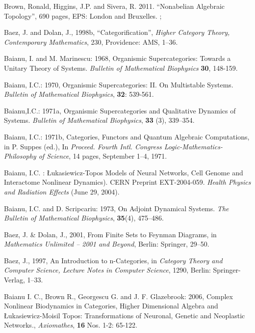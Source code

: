 \documentclass[12pt]{article}
\theoremstyle{plain}
\theoremstyle{definition}
\numberwithin{equation}{section}
\begin{document}
\begin{thebibliography}{99}

Brown, Ronald, Higgins, J.P. and Sivera, R. 2011. ``Nonabelian Algebraic Topology'', 690 pages,  EPS: London and Bruxelles. ;


Baez, J. and Dolan, J., 1998b, ``Categorification'', {\em Higher Category Theory, Contemporary Mathematics}, 230, Providence: AMS, 1--36.

Baianu, I. and M. Marinescu: 1968, Organismic Supercategories: Towards a Unitary Theory of Systems. \emph{Bulletin of Mathematical Biophysics} \textbf{30}, 148-159.

Baianu, I.C.: 1970, Organismic Supercategories: II. On Multistable Systems. \emph{Bulletin of Mathematical Biophysics}, \textbf{32}: 539-561.

Baianu,I.C.: 1971a, Organismic Supercategories and Qualitative Dynamics of Systems. \emph{Bulletin of Mathematical Biophysics}, \textbf{33} (3), 339--354.

Baianu, I.C.: 1971b, Categories, Functors and Quantum Algebraic Computations, in P. Suppes (ed.), In \emph{Proceed. Fourth Intl. Congress Logic-Mathematics-Philosophy of Science}, 14 pages, September 1--4, 1971. 

Baianu, I.C. : \L ukasiewicz-Topos Models of Neural Networks, Cell Genome and Interactome Nonlinear Dynamics). CERN Preprint EXT-2004-059. \textit{Health Physics and Radiation Effects} (June 29, 2004).

Baianu, I.C.  and D. Scripcariu: 1973, On Adjoint Dynamical Systems. \emph{The Bulletin of Mathematical Biophysics}, \textbf{35}(4), 475--486.

Baez, J. \& Dolan, J., 2001, From Finite Sets to Feynman Diagrams,
in \emph{Mathematics Unlimited -- 2001 and Beyond}, Berlin: Springer, 29--50.

Baez, J., 1997, An Introduction to n-Categories,
in \emph{Category Theory and Computer Science, Lecture Notes in Computer Science}, 1290, Berlin: Springer-Verlag, 1--33.

Baianu I. C., Brown R., Georgescu G. and J. F. Glazebrook: 2006, Complex Nonlinear Biodynamics in Categories, Higher Dimensional Algebra and \L{}ukasiewicz-Moisil Topos: Transformations of Neuronal, Genetic and Neoplastic Networks.,
\emph{Axiomathes}, \textbf{16} Nos. 1-2: 65-122.


\end{thebibliography}
\end{document}
